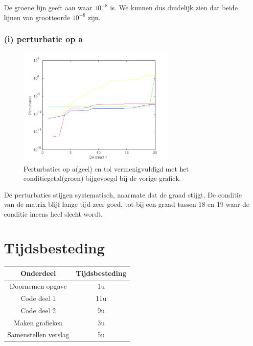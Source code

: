\documentclass[11pt,a4paper]{article}
\begin{document}
De groene lijn geeft aan waar $10^{-8}$ is. We kunnen dus duidelijk zien dat beide lijnen van grootteorde $10^{-8}$ zijn.

\subsubsection*{(i) perturbatie op a}

\begin{figure}[H]
	\centering
	\includegraphics[width=0.7\textwidth]{22i1.png}
	\caption*{Perturbaties op a(geel) en tol vermenigvuldigd met het conditiegetal(groen) bijgevoegd bij de vorige grafiek.}
	\end{figure}
De perturbaties stijgen systematisch, naarmate dat de graad stijgt. De conditie van de matrix blijf lange tijd zeer goed, tot bij een graad tussen 18 en 19 waar de conditie ineens heel slecht wordt.
\section{Tijdsbesteding}
\begin{center}
\begin{tabular}{ c || c }
Onderdeel & Tijdsbesteding\\
\hline
\hline
Doornemen opgave & 1u\\
\hline
Code deel 1 & 11u\\
\hline
Code deel 2 & 9u\\
\hline
Maken grafieken & 3u\\
\hline
Samenstellen verslag & 5u
\end{tabular}
\end{center}
\end{document}
